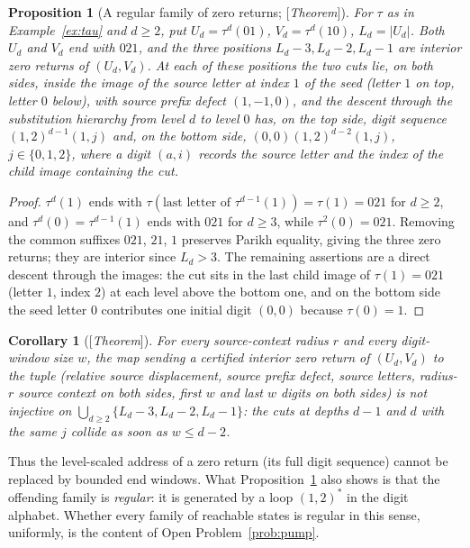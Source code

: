 \documentclass[11pt]{amsart}
\theoremstyle{plain}
\newtheorem{proposition}[theorem]{Proposition}
\newtheorem{corollary}[theorem]{Corollary}
\theoremstyle{definition}
\theoremstyle{remark}
\newcommand{\Status}[1]{\textup{[\textit{#1}]}}
\begin{document}
\begin{proposition}[A regular family of zero returns; \Status{Theorem}]\label{prop:regular-family}
For $\tau$ as in Example~\ref{ex:tau} and $d\ge2$, put $U_d=\tau^d(01)$, $V_d=\tau^d(10)$, $L_d=|U_d|$. Both $U_d$ and $V_d$ end with $021$, and the three positions $L_d-3,L_d-2,L_d-1$ are interior zero returns of $(U_d,V_d)$. At each of these positions the two cuts lie, on both sides, inside the image of the source letter at index $1$ of the seed (letter $1$ on top, letter $0$ below), with source prefix defect $(1,-1,0)$, and the descent through the substitution hierarchy from level $d$ to level $0$ has, on the top side, digit sequence $(1,2)^{d-1}(1,j)$ and, on the bottom side, $(0,0)(1,2)^{d-2}(1,j)$, $j\in\{0,1,2\}$, where a digit $(a,i)$ records the source letter and the index of the child image containing the cut.
\end{proposition}
\begin{proof}
$\tau^d(1)$ ends with $\tau(\text{last letter of }\tau^{d-1}(1))=\tau(1)=021$ for $d\ge2$, and $\tau^d(0)=\tau^{d-1}(1)$ ends with $021$ for $d\ge3$, while $\tau^2(0)=021$. Removing the common suffixes $021$, $21$, $1$ preserves Parikh equality, giving the three zero returns; they are interior since $L_d>3$. The remaining assertions are a direct descent through the images: the cut sits in the last child image of $\tau(1)=021$ (letter $1$, index $2$) at each level above the bottom one, and on the bottom side the seed letter $0$ contributes one initial digit $(0,0)$ because $\tau(0)=1$.
\end{proof}

\begin{corollary}[\Status{Theorem}]\label{cor:windows-not-injective}
For every source-context radius $r$ and every digit-window size $w$, the map sending a certified interior zero return of $(U_d,V_d)$ to the tuple (relative source displacement, source prefix defect, source letters, radius-$r$ source context on both sides, first $w$ and last $w$ digits on both sides) is not injective on $\bigcup_{d\ge2}\{L_d-3,L_d-2,L_d-1\}$: the cuts at depths $d-1$ and $d$ with the same $j$ collide as soon as $w\le d-2$.
\end{corollary}

Thus the level-scaled address of a zero return (its full digit sequence) cannot be replaced by bounded end windows. What Proposition~\ref{prop:regular-family} also shows is that the offending family is \emph{regular}: it is generated by a loop $(1,2)^*$ in the digit alphabet. Whether every family of reachable states is regular in this sense, uniformly, is the content of Open Problem~\ref{prob:pump}.
\end{document}
